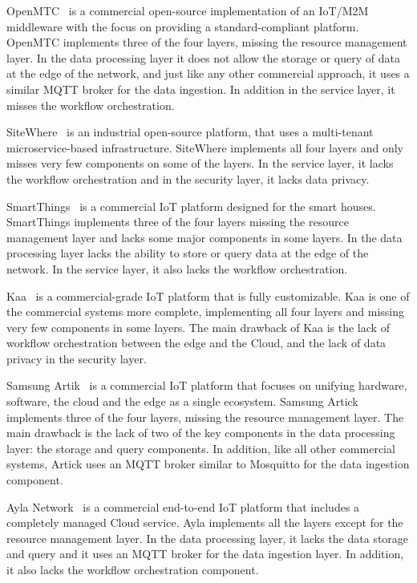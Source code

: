 OpenMTC~\cite{openMTC} is a commercial open-source implementation of an IoT/M2M middleware with the focus on providing a standard-compliant platform. OpenMTC implements three of the four layers, missing the resource management layer. In the data processing layer it does not allow the storage or query of data at the edge of the network, and just like any other commercial approach, it uses a similar MQTT broker for the data ingestion. In addition in the service layer, it misses the workflow orchestration.

SiteWhere~\cite{SiteWhere} is an industrial open-source platform, that uses a multi-tenant microservice-based infrastructure. SiteWhere implements all four layers and only misses very few components on some of the layers. In the service layer, it lacks the workflow orchestration and in the security layer, it lacks data privacy.

SmartThings~\cite{SmartThings} is a commercial IoT platform designed for the smart houses. SmartThings implements three of the four layers missing the resource management layer and lacks some major components in some layers. In the data processing layer lacks the ability to store or query data at the edge of the network. In the service layer, it also lacks the workflow orchestration.

Kaa~\cite{Kaa} is a commercial-grade IoT platform that is fully customizable. Kaa is one of the commercial systems more complete, implementing all four layers and missing very few components in some layers. The main drawback of Kaa is the lack of workflow orchestration between the edge and the Cloud, and the lack of data privacy in the security layer.

Samsung Artik~\cite{Samsung_Artik} is a commercial IoT platform that 
focuses on unifying hardware, software, the cloud and the edge as a single ecosystem. Samsung Artick implements three of the four layers, missing the resource management layer. The main drawback is the lack of two of the key components in the data processing layer: the storage and query components. In addition, like all other commercial systems, Artick uses an MQTT broker similar to Mosquitto for the data ingestion component.

Ayla Network~\cite{Ayla_Networks} is a commercial end-to-end IoT platform that includes a completely managed Cloud service. Ayla implements all the layers except for the resource management layer. In the data processing layer, it lacks the data storage and query and it uses an MQTT broker for the data ingestion layer. In addition, it also lacks the workflow orchestration component.

